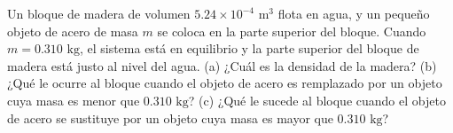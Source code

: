 \item Un bloque de madera de volumen $5.24 \times 10^{-4} \text{ m}^3$ flota en agua, y un pequeño objeto de acero de masa $m$ se coloca en la parte superior del bloque. Cuando $m = 0.310 \text{ kg}$, el sistema está en equilibrio y la parte superior del bloque de madera está justo al nivel del agua. (a) ¿Cuál es la densidad de la madera? (b) ¿Qué le ocurre al bloque cuando el objeto de acero es remplazado por un objeto cuya masa es menor que $0.310 \text{ kg}$? (c) ¿Qué le sucede al bloque cuando el objeto de acero se sustituye por un objeto cuya masa es mayor que $0.310 \text{ kg}$?
